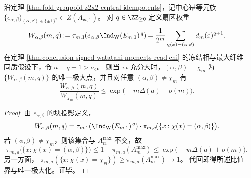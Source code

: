 \begin{theorem}\label{thm:conclusion-chi-variational-sector-maximization}
沿定理 \ref{thm:fold-groupoid-z2x2-central-idempotents}，记中心幂等元族
\(
\{e_{\alpha,\beta}\}_{(\alpha,\beta)\in\{\pm1\}^2}\subset Z(A_{m,1})
\)。
对 \(q\in\ZZ_{\ge0}\) 定义扇区权重
\[
W_{\alpha,\beta}(m,q):=
\tau_{m,1}\!\left(e_{\alpha,\beta}\Ind_{\mathrm W}(E_{m,1})^{\,q}\right)
=\frac1{2^m}\sum_{\chi(x)=(\alpha,\beta)}d_m(x)^{q+1}.
\]
在定理 \ref{thm:conclusion-signed-watatani-moments-read-chi} 的冻结相与最大纤维同质假设下，令 \(a=q+1>a_{\mathrm c}\)。
则当 \(m\) 充分大时，\((\alpha,\beta)=\chi_m\) 为 \(\{W_{\alpha,\beta}(m,q)\}\) 的唯一极大点，并且对任意 \((\alpha,\beta)\neq\chi_m\) 有
\[
\frac{W_{\alpha,\beta}(m,q)}{W_{\chi_m}(m,q)}
\le
\exp\!\bigl(-m\Delta(a)+o(m)\bigr).
\]
\end{theorem}
\begin{proof}
由 \(e_{\alpha,\beta}\) 的块投影定义，
\[
W_{\alpha,\beta}(m,q)
=\tau_{m,1}\!\left(\Ind_{\mathrm W}(E_{m,1})^{\,q}\right)\cdot
\pi_{m,a}\!\bigl(\{x:\chi(x)=(\alpha,\beta)\}\bigr).
\]
若 \((\alpha,\beta)\neq\chi_m\)，则该集合与 \(A_m^{\max}\) 不交，故
\[
\pi_{m,a}\!\bigl(\{x:\chi(x)=(\alpha,\beta)\}\bigr)
\le
1-\pi_{m,a}(A_m^{\max})
\le
\exp\!\bigl(-m\Delta(a)+o(m)\bigr).
\]
另一方面，
\(
\pi_{m,a}(\{x:\chi(x)=\chi_m\})\ge \pi_{m,a}(A_m^{\max})\to 1
\)。
代回即得所述比值界与唯一极大化。证毕。
\end{proof}

